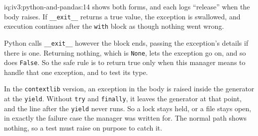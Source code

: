 \begin{solution}{iq:iv3:python-and-pandas:14}
 shows both forms, and each logs ``release'' when the body raises. If \texttt{\_\_exit\_\_} returns a true value, the exception is swallowed, and execution continues after the \texttt{with} block as though nothing went wrong.
\label{lst:iv3:pp:context}

Python calls \texttt{\_\_exit\_\_} however the block ends, passing the exception's details if there is one. Returning nothing, which is \texttt{None}, lets the exception go on, and so does \texttt{False}. So the safe rule is to return true only when this manager means to handle that one exception, and to test its type.

In the \texttt{contextlib} version, an exception in the body is raised inside the generator at the \texttt{yield}. Without \texttt{try} and \texttt{finally}, it leaves the generator at that point, and the line after the \texttt{yield} never runs. So a lock stays held, or a file stays open, in exactly the failure case the manager was written for. The normal path shows nothing, so a test must raise on purpose to catch it.

\end{solution}

